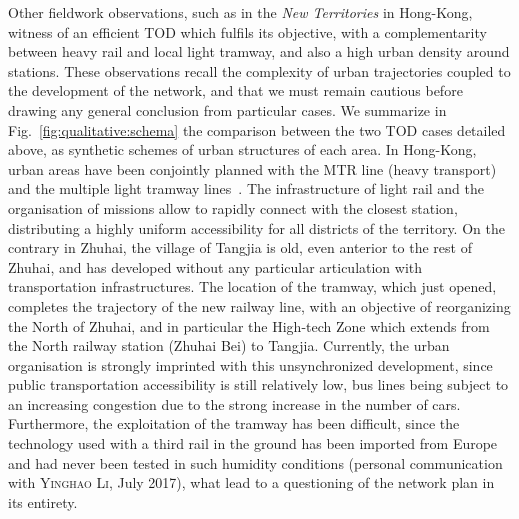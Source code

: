 \documentclass[11pt]{article}
\newcommand{\noun}[1]{\textsc{#1}}
\begin{document}
Other fieldwork observations, such as in the \emph{New Territories} in Hong-Kong, witness of an efficient TOD which fulfils its objective, with a complementarity between heavy rail and local light tramway, and also a high urban density around stations. These observations recall the complexity of urban trajectories coupled to the development of the network, and that we must remain cautious before drawing any general conclusion from particular cases. We summarize in Fig.~\ref{fig:qualitative:schema} the comparison between the two TOD cases detailed above, as synthetic schemes of urban structures of each area. In Hong-Kong, urban areas have been conjointly planned with the MTR line (heavy transport) and the multiple light tramway lines~\citep{hui2005study}. The infrastructure of light rail and the organisation of missions allow to rapidly connect with the closest station, distributing a highly uniform accessibility for all districts of the territory. On the contrary in Zhuhai, the village of Tangjia is old, even anterior to the rest of Zhuhai, and has developed without any particular articulation with transportation infrastructures. The location of the tramway, which just opened, completes the trajectory of the new railway line, with an objective of reorganizing the North of Zhuhai, and in particular the High-tech Zone which extends from the North railway station (Zhuhai Bei) to Tangjia. Currently, the urban organisation is strongly imprinted with this unsynchronized development, since public transportation accessibility is still relatively low, bus lines being subject to an increasing congestion due to the strong increase in the number of cars. Furthermore, the exploitation of the tramway has been difficult, since the technology used with a third rail in the ground has been imported from Europe and had never been tested in such humidity conditions (personal communication with \noun{Yinghao Li}, July 2017), what lead to a questioning of the network plan in its entirety. 
\end{document}
